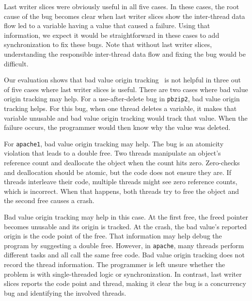 \documentclass[preprint,9pt]{sigplanconf}
\begin{document}
Last writer slices were obviously useful in all five cases.  In these cases,
the root cause of the bug becomes clear when last writer slices show the
inter-thread data flow led to a variable having a value that caused a failure.
Using that information, we expect it would be straightforward in these cases to
add synchronization to fix these bugs.  Note that without last writer slices,
understanding the responsible inter-thread data flow and fixing the bug would
be difficult.  

Our evaluation shows that bad value origin tracking~\cite{badapples} is not
helpful in three out of five cases where last writer slices is useful.  
There are two cases where bad value origin tracking may help.  For a
use-after-delete bug in {\tt pbzip2}, bad value origin tracking helps.  For
this bug, when one thread deletes a variable, it makes that variable unusable
and bad value origin tracking would track that value.  When the failure occurs,
the programmer would then know why the value was deleted.  

For {\tt apache1}, bad value origin tracking may help.  The bug is an atomicity
violation that leads to a double free.  Two threads manipulate an object's
reference count and deallocate the object when the count hits zero. Zero-checks
and deallocation should be atomic, but the code does not ensure they are.  If
threads interleave their code, multiple threads might see zero reference
counts, which is incorrect.  When that happens, both threads try to free the
object and the second free causes a crash.  

Bad value origin tracking may help in this case.  At the first free, the freed
pointer becomes unusable and its origin is tracked.  At the crash, the bad
value's reported origin is the code point of the free. That information may
help debug the program by suggesting a double free.  However, in {\tt apache},
many threads perform different tasks and all call the same free code.  Bad
value origin tracking does not record the thread information.  The programmer
is left unsure whether the problem is with single-threaded logic or
synchronization.  In contrast, last writer slices reports the code point and
thread, making it clear the bug is a concurrency bug and identifying the
involved threads.
\end{document}
